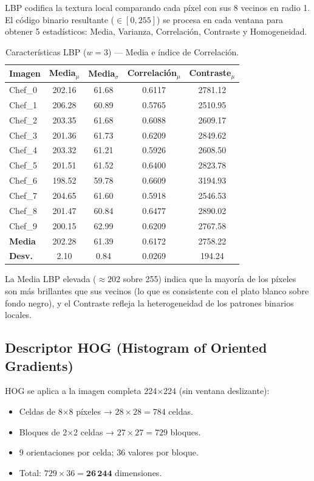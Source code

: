 \documentclass[12pt,a4paper]{article}
\begin{document}
LBP codifica la textura local comparando cada píxel con sus 8
vecinos en radio 1.  El código binario resultante ($\in[0,255]$) se
procesa en cada ventana para obtener 5 estadísticos:
Media, Varianza, Correlación, Contraste y Homogeneidad.

\begin{table}[H]
\centering
\caption{Características LBP ($w=3$) — Media e índice de Correlación.}
\label{tab:lbp_w3}
\setlength{\tabcolsep}{5pt}
\begin{tabular}{@{}lcccc@{}}
\toprule
\textbf{Imagen} & \textbf{Media$_\mu$} & \textbf{Media$_\sigma$} &
  \textbf{Correlación$_\mu$} & \textbf{Contraste$_\mu$} \\
\midrule
Chef\_0 & 202.16 & 61.68 & 0.6117 & 2781.12 \\
Chef\_1 & 206.28 & 60.89 & 0.5765 & 2510.95 \\
Chef\_2 & 203.35 & 61.68 & 0.6088 & 2609.17 \\
Chef\_3 & 201.36 & 61.73 & 0.6209 & 2849.62 \\
Chef\_4 & 203.32 & 61.21 & 0.5926 & 2608.50 \\
Chef\_5 & 201.51 & 61.52 & 0.6400 & 2823.78 \\
Chef\_6 & 198.52 & 59.78 & 0.6609 & 3194.93 \\
Chef\_7 & 204.65 & 61.60 & 0.5918 & 2546.53 \\
Chef\_8 & 201.47 & 60.84 & 0.6477 & 2890.02 \\
Chef\_9 & 200.15 & 62.99 & 0.6209 & 2767.58 \\
\midrule
\textbf{Media} & 202.28 & 61.39 & 0.6172 & 2758.22 \\
\textbf{Desv.}  &   2.10 &  0.84 & 0.0269 & 194.24  \\
\bottomrule
\end{tabular}
\end{table}

\noindent La Media LBP elevada ($\approx 202$ sobre 255) indica que la
mayoría de los píxeles son más brillantes que sus vecinos (lo que es
consistente con el plato blanco sobre fondo negro), y el Contraste
refleja la heterogeneidad de los patrones binarios locales.

\subsection{Descriptor HOG (Histogram of Oriented Gradients)}

HOG se aplica a la imagen completa 224×224 (sin ventana deslizante):
\begin{itemize}[nosep]
  \item Celdas de 8×8 píxeles → $28 \times 28 = 784$ celdas.
  \item Bloques de 2×2 celdas → $27 \times 27 = 729$ bloques.
  \item 9 orientaciones por celda; 36 valores por bloque.
  \item Total: $729 \times 36 = \mathbf{26\,244}$ dimensiones.
\end{itemize}
\end{document}
